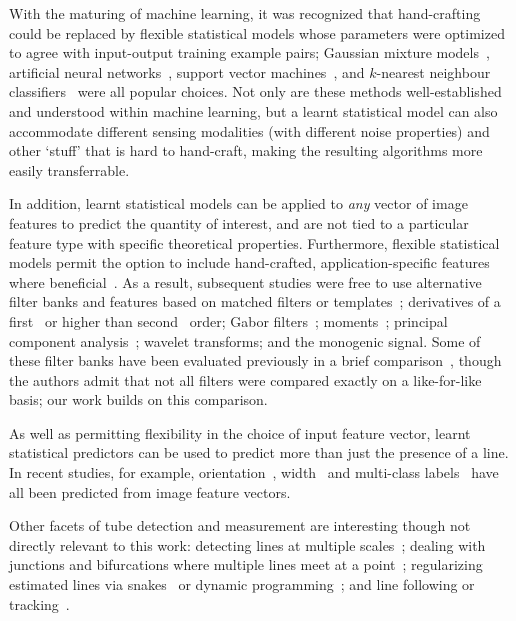 \documentclass{IEEEtran}
\begin{document}
With the maturing of machine learning, it was recognized that hand-crafting could be replaced by flexible statistical models whose parameters were optimized to agree with input-output training example pairs; Gaussian mixture models~\cite{Soares_etal_TMI06}, %
artificial neural networks~\cite{Marin_etal_TMI11,Minh_Hinton_ECCV10}, %
support vector machines~\cite{Ricci_Perfetti_TMI07,Gonzalez_etal_CVPR09}, and %
$k$-nearest neighbour classifiers~\cite{Staal_etal_TMI04} were all popular choices. Not only are these methods well-established and understood within machine learning, but a learnt statistical model can also accommodate different sensing modalities (with different noise properties) and other `stuff' that is hard to hand-craft, making the resulting algorithms more easily transferrable.

In addition, learnt statistical models can be applied to \emph{any} vector of image features to predict the quantity of interest, and are not tied to a particular feature type with specific theoretical properties. Furthermore, flexible statistical models permit the option to include hand-crafted, application-specific features where beneficial~\cite{Staal_etal_TMI04}. As a result, subsequent studies were free to use alternative filter banks and features based on %
matched filters or templates~\cite{Chaudhuri_etal_TMI89,Pechaud_etal_CVPR09,Dixon_Taylor_IPC79,Hoover_etal_TMI00,Ricci_Perfetti_TMI07}; %
derivatives of a first~\cite{Cai_Chung_MICCAI06} or higher than second~\cite{Gonzalez_etal_CVPR09} order; %
Gabor filters~\cite{Soares_etal_TMI06,Dabbah_etal_MIA11}; %
moments~\cite{Marin_etal_TMI11}; %
principal component analysis~\cite{Minh_Hinton_ECCV10}; %
wavelet transforms; %
and the monogenic signal. %
Some of these filter banks have been evaluated previously in a brief comparison~\cite{Ayres_Rangayyan_JEI07}, though the authors admit that not all filters were compared exactly on a like-for-like basis; our work builds on this comparison.

As well as permitting flexibility in the choice of input feature vector, learnt statistical predictors can be used to predict more than just the presence of a line. In recent studies, for example, orientation~\cite{Zwiggelaar_etal_TMI04,Ayres_Rangayyan_JEI07}, width~\cite{Steger_TPAMI98,Zwiggelaar_etal_TMI04} and multi-class labels~\cite{Zwiggelaar_etal_TMI04} have all been predicted from image feature vectors.

Other facets of tube detection and measurement are interesting though not directly relevant to this work: %
detecting lines at multiple scales~\cite{Lindeberg_IJCV98,Sato_etal_MIA98}; %
dealing with junctions and bifurcations where multiple lines meet at a point~\cite{Chen_etal_TPAMI00};
regularizing estimated lines via snakes~\cite{Laptev_etal_MVA00} or dynamic programming~\cite{Gruen}; %
and line following or tracking~\cite{Aylward_Bullitt_TMI02,Perez_etal_ICCV01}.
\end{document}
